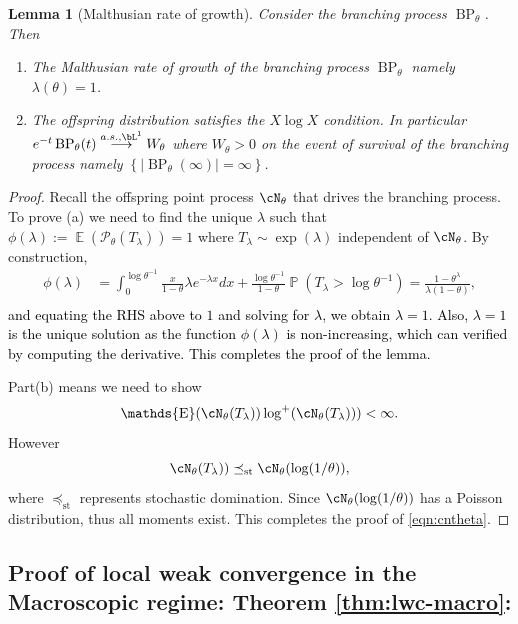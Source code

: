 \documentclass[letterpaper,11pt,reqno]{amsart}
\newenvironment{enumeratea}{\begin{enumerate}[\upshape a)]\setlength{\itemsep}{1ex}}{\end{enumerate}}
\newtheorem{lem}[thm]{Lemma}
\theoremstyle{definition}
\newcommand{\set}[1]{\left\{#1\right\}}
\newcommand{\cP}{\mathcal{P}}\newcommand{\cQ}{\mathcal{Q}}\newcommand{\cR}{\mathcal{R}}
\DeclareMathOperator{\E}{\mathds{E}}
\DeclareMathOperator{\pr}{\mathds{P}}
\newcommand{\stod}{\preceq_{\mathrm{st}}}
\DeclareMathOperator{\BP}{BP}
\begin{document}
\begin{lem}[Malthusian rate of growth]
\label{lem:malthus}
    Consider the branching process $\BP_\theta$. Then 
    \begin{enumeratea}
        \item The Malthusian rate of growth of the branching process $\BP_\theta$ namely $\lambda(\theta) =1$. 
        \item The offspring distribution satisfies the $X\log{X}$ condition. In particular $e^{-t}\BP_\theta(t)\stackrel{a.s., \bL^1}{\longrightarrow} W_\theta$ where $W_\theta >0$ on the event of survival of the branching process namely  $\set{|\BP_\theta(\infty)| = \infty}$. 
    \end{enumeratea}
\end{lem}
\begin{proof}
Recall the offspring point process $\cN_\theta$ that drives the branching process.  To prove (a) we need to find the unique $\lambda$ such that $\phi(\lambda):= \E(\cP_\theta(T_\lambda)) = 1$    where $T_\lambda\sim \exp(\lambda)$ independent of $\cN_\theta$. By construction, 
\begin{align*}
    \phi(\lambda) &= \int_0^{\log{\theta^{-1}}} \frac{x}{1-\theta} \lambda e^{-\lambda x}dx + \frac{\log{\theta^{-1}}}{1-\theta} \pr(T_\lambda > \log{\theta^{-1}}) =\frac{1-\theta^\lambda}{\lambda(1-\theta)}, \\
\end{align*}
\textcolor{black}{and equating the RHS above to $1$ and solving for $\lambda$, we obtain $\lambda=1$. Also, $\lambda = 1$ is the unique solution as the function $\phi(\lambda)$ is non-increasing, which can verified by computing the derivative. This completes the proof of the lemma. }

Part(b) means we need to show 
\begin{equation}
    \E(\cN_\theta(T_\lambda))\log^+(\cN_\theta(T_\lambda))) < \infty.
    \label{eqn:cntheta}
\end{equation} However \[\cN_\theta(T_\lambda)) \stod \cN_\theta(\log(1/\theta)),\] where $\stod$ represents stochastic domination. Since $\cN_\theta(\log(1/\theta))$ has a Poisson distribution, thus all moments exist. This completes the proof of \eqref{eqn:cntheta}. 
\end{proof}



\subsection{Proof of local weak convergence in the Macroscopic regime: Theorem \ref{thm:lwc-macro}:} \label{sec:proof-lwc-macro}
 
\end{document}
